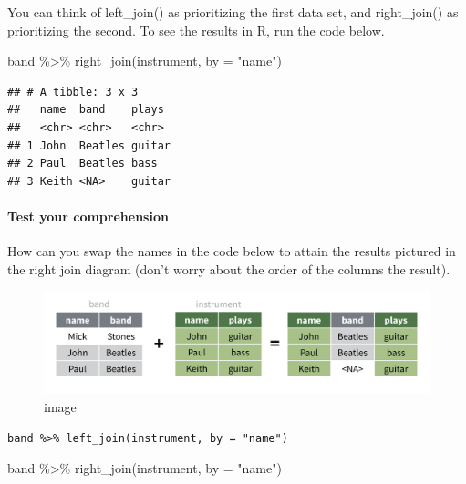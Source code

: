 \documentclass[
]{article}
\newenvironment{Shaded}{\begin{snugshade}}{\end{snugshade}}
\newcommand{\AttributeTok}[1]{\textcolor[rgb]{0.77,0.63,0.00}{#1}}
\newcommand{\FunctionTok}[1]{\textcolor[rgb]{0.00,0.00,0.00}{#1}}
\newcommand{\NormalTok}[1]{#1}
\newcommand{\SpecialCharTok}[1]{\textcolor[rgb]{0.00,0.00,0.00}{#1}}
\newcommand{\StringTok}[1]{\textcolor[rgb]{0.31,0.60,0.02}{#1}}
\begin{document}
You can think of left\_join() as prioritizing the first data set, and
right\_join() as prioritizing the second. To see the results in R, run
the code below.

\begin{Shaded}
\begin{Highlighting}[]
\NormalTok{band }\SpecialCharTok{\%\textgreater{}\%} \FunctionTok{right\_join}\NormalTok{(instrument, }\AttributeTok{by =} \StringTok{"name"}\NormalTok{)}
\end{Highlighting}
\end{Shaded}

\begin{verbatim}
## # A tibble: 3 x 3
##   name  band    plays 
##   <chr> <chr>   <chr> 
## 1 John  Beatles guitar
## 2 Paul  Beatles bass  
## 3 Keith <NA>    guitar
\end{verbatim}

\hypertarget{test-your-comprehension}{%
\paragraph{Test your comprehension}\label{test-your-comprehension}}

How can you swap the names in the code below to attain the results
pictured in the right join diagram (don't worry about the order of the
columns the result).

\begin{figure}
\centering
\includegraphics{data/right-join-1.png}
\caption{image}
\end{figure}

\begin{verbatim}
band %>% left_join(instrument, by = "name")
\end{verbatim}

\begin{Shaded}
\begin{Highlighting}[]
\NormalTok{band }\SpecialCharTok{\%\textgreater{}\%} \FunctionTok{right\_join}\NormalTok{(instrument, }\AttributeTok{by =} \StringTok{"name"}\NormalTok{)}
\end{Highlighting}
\end{Shaded}
\end{document}
